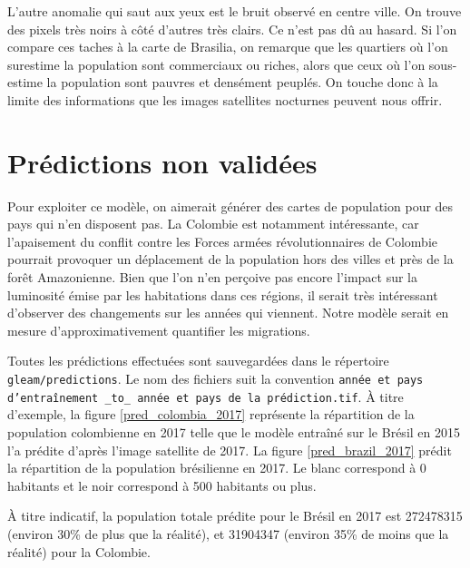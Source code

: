 \documentclass[a4paper, 11pt]{report}
\begin{document}
L'autre anomalie qui saut aux yeux est le bruit observé en centre ville. On trouve des pixels très noirs à côté d'autres très clairs. Ce n'est pas dû au hasard. Si l'on compare ces taches à la carte de Brasilia, on remarque que les quartiers où l'on surestime la population sont commerciaux ou riches, alors que ceux où l'on sous-estime la population sont pauvres et densément peuplés. On touche donc à la limite des informations que les images satellites nocturnes peuvent nous offrir.

\section{Prédictions non validées}
Pour exploiter ce modèle, on aimerait générer des cartes de population pour des pays qui n'en disposent pas. La Colombie est notamment intéressante, car l'apaisement du conflit contre les Forces armées révolutionnaires de Colombie pourrait provoquer un déplacement de la population hors des villes et près de la forêt Amazonienne. Bien que l'on n'en perçoive pas encore l'impact sur la luminosité émise par les habitations dans ces régions, il serait très intéressant d'observer des changements sur les années qui viennent. Notre modèle serait en mesure d'approximativement quantifier les migrations.

Toutes les prédictions effectuées sont sauvegardées dans le répertoire \texttt{gleam/predictions}. Le nom des fichiers suit la convention \texttt{année et pays d'entraînement \_to\_ année et pays de la prédiction.tif}. À titre d'exemple, la figure \ref{pred_colombia_2017} représente la répartition de la population colombienne en 2017 telle que le modèle entraîné sur le Brésil en 2015 l'a prédite d'après l'image satellite de 2017. La figure \ref{pred_brazil_2017} prédit la répartition de la population brésilienne en 2017. Le blanc correspond à 0 habitants et le noir correspond à 500 habitants ou plus.

À titre indicatif, la population totale prédite pour le Brésil en 2017 est 272478315 (environ 30\% de plus que la réalité), et 31904347 (environ 35\% de moins que la réalité) pour la Colombie.
\end{document}
